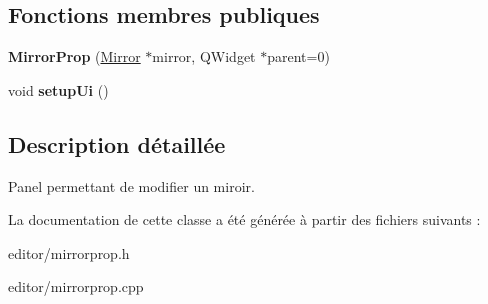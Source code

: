 \subsection*{Fonctions membres publiques}
\begin{DoxyCompactItemize}
\item 
\hypertarget{classMirrorProp_a66f3827e136a4de797881f58e3b2c2f5}{{\bfseries Mirror\+Prop} (\hyperlink{classMirror}{Mirror} $\ast$mirror, Q\+Widget $\ast$parent=0)}\label{classMirrorProp_a66f3827e136a4de797881f58e3b2c2f5}

\item 
\hypertarget{classMirrorProp_a78eb9900a2efb1ac16bae7956d21ac65}{void {\bfseries setup\+Ui} ()}\label{classMirrorProp_a78eb9900a2efb1ac16bae7956d21ac65}

\end{DoxyCompactItemize}


\subsection{Description détaillée}
Panel permettant de modifier un miroir. 

La documentation de cette classe a été générée à partir des fichiers suivants \+:\begin{DoxyCompactItemize}
\item 
editor/mirrorprop.\+h\item 
editor/mirrorprop.\+cpp\end{DoxyCompactItemize}
